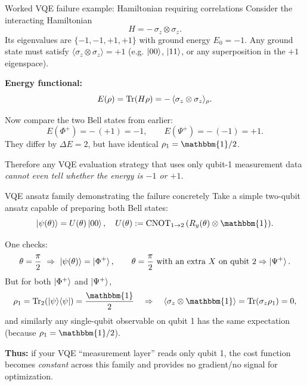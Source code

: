 \documentclass[aspectratio=169]{beamer}
\newcommand{\Z}{\sigma_z}
\newcommand{\I}{\mathbbm{1}}
\begin{document}
\begin{frame}{Worked VQE failure example: Hamiltonian requiring correlations}
Consider the interacting Hamiltonian
\[
H = -\,\Z\otimes\Z.
\]
Its eigenvalues are \(\{-1,-1,+1,+1\}\) with ground energy \(E_0=-1\).
Any ground state must satisfy \(\langle \Z\otimes\Z\rangle=+1\)
(e.g. \(\ket{00}\), \(\ket{11}\), or any superposition in the \(+1\) eigenspace).

\medskip
\textbf{Energy functional:}
\[
E(\rho)=\Tr(H\rho) = -\,\langle \Z\otimes\Z\rangle_\rho.
\]

\medskip
Now compare the two Bell states from earlier:
\[
E(\Phi^+) = -\,(+1)=-1,\qquad E(\Psi^+)=-\,(-1)=+1.
\]
They differ by \(\Delta E=2\), but have identical \(\rho_1=\I/2\).

\medskip
Therefore any VQE evaluation strategy that uses only qubit-1 measurement data \emph{cannot even tell whether the energy is \(-1\) or \(+1\)}.
\end{frame}



\begin{frame}{VQE ansatz family demonstrating the failure concretely}
Take a simple two-qubit ansatz capable of preparing both Bell states:
\[
\ket{\psi(\theta)} = U(\theta)\ket{00},
\quad
U(\theta) := \mathrm{CNOT}_{1\to 2}\,(R_y(\theta)\otimes \I).
\]

One checks:
\[
\theta=\frac{\pi}{2}\ \Rightarrow\ \ket{\psi(\theta)}=\ket{\Phi^+},
\qquad
\theta=\frac{\pi}{2}\ \text{with an extra }X\text{ on qubit 2}\Rightarrow \ket{\Psi^+}.
\]
\medskip
But for both \(\ket{\Phi^+}\) and \(\ket{\Psi^+}\),
\[
\rho_1=\Tr_2(\ket{\psi}\!\bra{\psi})=\frac{\I}{2}
\quad\Rightarrow\quad
\langle \Z\otimes\I\rangle = \Tr(\Z\rho_1)=0,
\]
and similarly any single-qubit observable on qubit 1 has the same expectation (because \(\rho_1=\I/2\)).

\medskip
\textbf{Thus:} if your VQE ``measurement layer'' reads only qubit 1, the cost function becomes \emph{constant} across this family and provides no gradient/no signal for optimization.
\end{frame}
\end{document}
